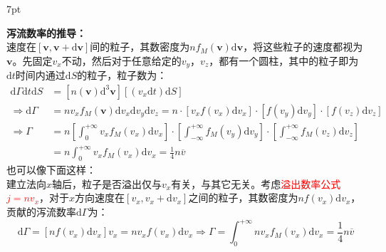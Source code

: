 \documentclass[zihao=5,UTF8]{report}
\newenvironment{graybox}{%
\def\FrameCommand{%
\hspace{1pt}%
{\color{gray}\small \vrule width 2pt}%
{\color{graybox_color}\vrule width 4pt}%
\colorbox{graybox_color}%
}%
\MakeFramed{\advance\hsize-\width\FrameRestore}%
\noindent\hspace{-4.55pt}%
\begin{adjustwidth}{}{7pt}%
\vspace{2pt}\vspace{2pt}%
}
{%
\vspace{2pt}\end{adjustwidth}\endMakeFramed%
}
\begin{document}
\begin{graybox}
    \textbf{泻流数率的推导：}\\
    速度在$[\boldsymbol{v},\boldsymbol{v}+\mathrm{d}\boldsymbol{v}]$间的粒子，其数密度为$ nf_M(\boldsymbol{v})\mathrm{d}\boldsymbol{v}$，将这些粒子的速度都视为$\boldsymbol{v}$。先固定$v_x$不动，然后对于任意给定的$v_y$，$v_z$，都有一个圆柱，其中的粒子即为$\mathrm{d}t$时间内通过$\mathrm{d}S$的粒子，粒子数为：
    \begin{align*}
        \mathrm{d}\Gamma\mathrm{d}t \mathrm{d}S&= \left[n(\boldsymbol{v})\mathrm{d}^3\boldsymbol{v}\right]\left[(v_x\mathrm{d}t)\mathrm{d}S\right]\\
        \Longrightarrow  \mathrm{d}\Gamma &= n v_xf_M(\boldsymbol{v})\mathrm{d}v_x\mathrm{d}v_y\mathrm{d}v_z = n\cdot[v_xf(v_x)\mathrm{d}v_x]\cdot[f(v_y)\mathrm{d}v_y]\cdot[f(v_z)\mathrm{d}v_z]\\
        \Longrightarrow \Gamma 
        &= n \left[\int_{0}^{+\infty}v_xf_M(v_x)\mathrm{d}v_x \right] \cdot \left[\int_{-\infty}^{+\infty}  f_M(v_y)\mathrm{d}v_y\right]\cdot \left[\int_{-\infty}^{+\infty} f_M(v_z)\mathrm{d}v_z\right]\\
        & = n \int_{0}^{+\infty}v_xf_M(v_x)\mathrm{d}v_x = \frac{1}{4}n  \overline{v}
    \end{align*}
也可以像下面这样：\\
建立法向$x$轴后，粒子是否溢出仅与$v_x$有关，与其它无关。考虑\textcolor{red}{溢出数率公式$j = nv_x$}，对于$x$方向速度在$[v_x, v_x + \mathrm{d}v_x]$之间的粒子，其数密度为$nf(v_x)\mathrm{d}v_x$，贡献的泻流数率$ \mathrm{d}\Gamma $为：
\begin{equation}
    \mathrm{d}\Gamma = [nf(v_x)\mathrm{d}v_x]v_x = n v_xf(v_x)\mathrm{d}v_x \Longrightarrow \Gamma = \int_{0}^{+\infty} n v_xf_M(v_x)\mathrm{d}v_x = \frac{1}{4}n  \overline{v} 
\end{equation}
\end{graybox}
\end{document}
